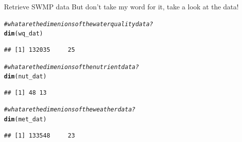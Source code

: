 \documentclass[xcolor=svgnames]{beamer}\usepackage[]{graphicx}\usepackage[]{color}
\makeatletter
\newcommand{\hlcom}[1]{\textcolor[rgb]{0.678,0.584,0.686}{\textit{#1}}}%
\newcommand{\hlstd}[1]{\textcolor[rgb]{0.345,0.345,0.345}{#1}}%
\newcommand{\hlkwd}[1]{\textcolor[rgb]{0.737,0.353,0.396}{\textbf{#1}}}%
\newenvironment{kframe}{%
 \def\at@end@of@kframe{}%
 \ifinner\ifhmode%
  \def\at@end@of@kframe{\end{minipage}}%
  \begin{minipage}{\columnwidth}%
 \fi\fi%
 \def\FrameCommand##1{\hskip\@totalleftmargin \hskip-\fboxsep
 \colorbox{shadecolor}{##1}\hskip-\fboxsep
     \hskip-\linewidth \hskip-\@totalleftmargin \hskip\columnwidth}%
 \MakeFramed {\advance\hsize-\width
   \@totalleftmargin\z@ \linewidth\hsize
   \@setminipage}}%
 {\par\unskip\endMakeFramed%
 \at@end@of@kframe}
\newenvironment{knitrout}{}{} %
\makeatother
\begin{document}
\begin{frame}[containsverbatim]{Retrieve SWMP data}
But don't take my word for it, take a look at the data!
\begin{knitrout}\scriptsize
{}\color{fgcolor}\begin{kframe}
\begin{alltt}
\hlcom{# what are the dimenions of the water quality data?}
\hlkwd{dim}\hlstd{(wq_dat)}
\end{alltt}
\begin{verbatim}
## [1] 132035     25
\end{verbatim}
\begin{alltt}
\hlcom{# what are the dimenions of the nutrient data?}
\hlkwd{dim}\hlstd{(nut_dat)}
\end{alltt}
\begin{verbatim}
## [1] 48 13
\end{verbatim}
\begin{alltt}
\hlcom{# what are the dimenions of the weather data?}
\hlkwd{dim}\hlstd{(met_dat)}
\end{alltt}
\begin{verbatim}
## [1] 133548     23
\end{verbatim}
\end{kframe}
\end{knitrout}
\end{frame}
\end{document}
